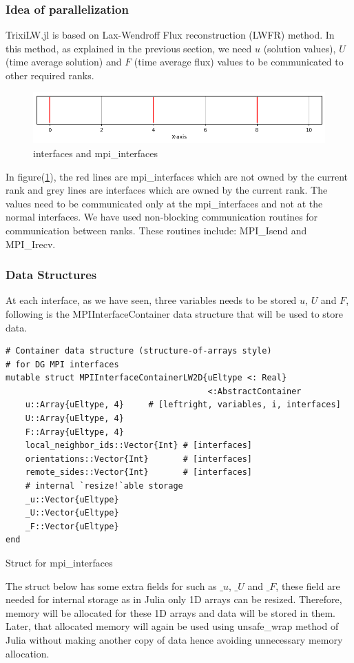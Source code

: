 \documentclass[12pt]{article}
\begin{document}
\subsubsection{Idea of parallelization}
{\ttfamily TrixiLW.jl} is based on Lax-Wendroff Flux reconstruction (LWFR) method. In this method, as explained in the previous section, we need $u$ (solution values), $U$ (time average
solution) and $F$ (time average flux) values to be communicated to other required ranks.

\begin{figure}[!ht]
    \centering
    \includegraphics[width=0.9\linewidth]{../attachments/1Dmesh.png}
    \caption{interfaces and mpi\_interfaces}
    \label{1}
\end{figure}
In figure(\ref{1}), the red lines are {\ttfamily mpi\_interfaces} which are not owned by the current rank and grey lines are {\ttfamily interfaces} which are owned by the current rank.
The values need to be communicated only at the {\ttfamily mpi\_interfaces}
and not at the normal {\ttfamily interfaces}. We have used non-blocking communication routines for communication between ranks. These routines include: {\ttfamily MPI\_Isend} and
{\ttfamily MPI\_Irecv}.

\subsubsection{Data Structures}
At each interface, as we have seen, three variables needs to be stored $u$, $U$ and $F$, following is the {\ttfamily MPIInterfaceContainer} data structure that will be used to store data.
\\ \vspace{21pt}
\begin{listing}[!ht]
\centering
\begin{verbatim}
# Container data structure (structure-of-arrays style) 
# for DG MPI interfaces
mutable struct MPIInterfaceContainerLW2D{uEltype <: Real}
                                         <:AbstractContainer
    u::Array{uEltype, 4}     # [leftright, variables, i, interfaces]
    U::Array{uEltype, 4}
    F::Array{uEltype, 4}
    local_neighbor_ids::Vector{Int} # [interfaces]
    orientations::Vector{Int}       # [interfaces]
    remote_sides::Vector{Int}       # [interfaces]
    # internal `resize!`able storage
    _u::Vector{uEltype}
    _U::Vector{uEltype}
    _F::Vector{uEltype}
end
\end{verbatim}
\caption{Struct for mpi\_interfaces}
\end{listing}
The {\ttfamily struct} below has some extra fields for such as $\_u$, $\_U$ and $\_F$, these field are needed for internal storage as in {\ttfamily Julia} only 1D arrays can be resized.
Therefore, memory will be allocated for these 1D arrays and data will be stored in them. Later, that allocated memory will again be used using {\ttfamily unsafe\_wrap} method of {\ttfamily Julia}
without making another copy of data hence avoiding unnecessary memory allocation.
\end{document}
